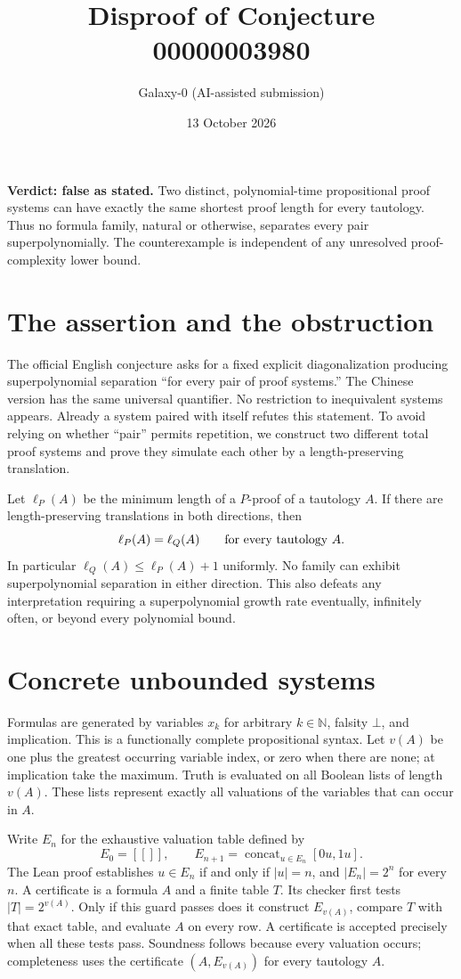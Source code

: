 \documentclass[11pt]{article}
\title{Disproof of Conjecture 00000003980}
\author{Galaxy-0 (AI-assisted submission)}
\date{13 October 2026}
\begin{document}
\maketitle
\noindent\textbf{Verdict: false as stated.} Two distinct, polynomial-time propositional proof systems can have exactly the same shortest proof length for every tautology. Thus no formula family, natural or otherwise, separates every pair superpolynomially. The counterexample is independent of any unresolved proof-complexity lower bound.

\section{The assertion and the obstruction}
The official English conjecture asks for a fixed explicit diagonalization producing superpolynomial separation ``for every pair of proof systems.'' The Chinese version has the same universal quantifier. No restriction to inequivalent systems appears. Already a system paired with itself refutes this statement. To avoid relying on whether ``pair'' permits repetition, we construct two different total proof systems and prove they simulate each other by a length-preserving translation.

Let $\ell_P(A)$ be the minimum length of a $P$-proof of a tautology $A$. If there are length-preserving translations in both directions, then
\[
       \ell_P(A)=\ell_Q(A)\qquad\hbox{for every tautology }A.
\]
In particular $\ell_Q(A)\leq \ell_P(A)+1$ uniformly. No family can exhibit superpolynomial separation in either direction. This also defeats any interpretation requiring a superpolynomial growth rate eventually, infinitely often, or beyond every polynomial bound.

\section{Concrete unbounded systems}
Formulas are generated by variables $x_k$ for arbitrary $k\in\mathbb N$, falsity $\bot$, and implication. This is a functionally complete propositional syntax. Let $v(A)$ be one plus the greatest occurring variable index, or zero when there are none; at implication take the maximum. Truth is evaluated on all Boolean lists of length $v(A)$. These lists represent exactly all valuations of the variables that can occur in $A$.

Write $E_n$ for the exhaustive valuation table defined by
\[
 E_0=[[]],\qquad
 E_{n+1}=\mathop{\mathrm{concat}}_{u\in E_n}[0u,1u].
\]
The Lean proof establishes $u\in E_n$ if and only if $|u|=n$, and $|E_n|=2^n$ for every $n$. A certificate is a formula $A$ and a finite table $T$. Its checker first tests $|T|=2^{v(A)}$. Only if this guard passes does it construct $E_{v(A)}$, compare $T$ with that exact table, and evaluate $A$ on every row. A certificate is accepted precisely when all these tests pass. Soundness follows because every valuation occurs; completeness uses the certificate $(A,E_{v(A)})$ for every tautology $A$.
\end{document}
